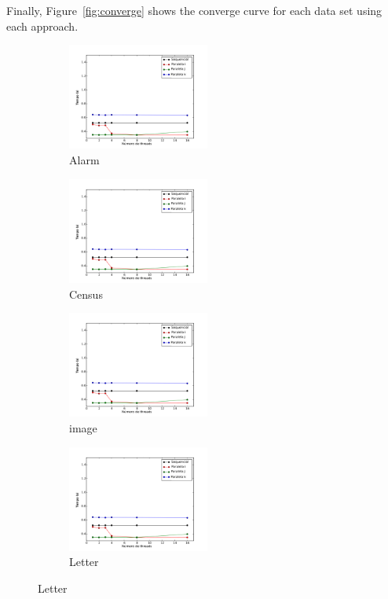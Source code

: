 	Finally, Figure~\ref{fig:converge} shows the converge curve for each data set using each approach.
	\begin{figure}[H]
		\centering
		\begin{subfigure}{.3\textwidth}
			\centering
			\includegraphics[height=3.5cm]{images/alarm}
			\caption{Alarm}
			\label{fig:alarm}
		\end{subfigure}
		\begin{subfigure}{.3\textwidth}
			\centering
			\includegraphics[height=3.5cm]{images/census}
			\caption{Census}
			\label{fig:census}
		\end{subfigure}
		\begin{subfigure}{.3\textwidth}
			\centering
			\includegraphics[height=3.5cm]{images/image}
			\caption{image}
			\label{fig:image}
		\end{subfigure}
		\begin{subfigure}{.3\textwidth}
			\centering
			\includegraphics[height=3.5cm]{images/letter}
			\caption{Letter}
			\label{fig:letter}
		\end{subfigure}

\end{figure}
